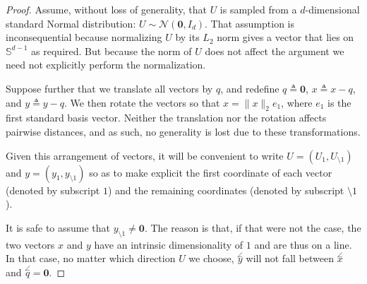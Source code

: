 \begin{proof}
Assume, without loss of generality, that $U$ is sampled from a $d$-dimensional standard Normal distribution: $U \sim \mathcal{N}(\mathbf{0}, I_d)$.
That assumption is inconsequential because normalizing $U$ by its $L_2$ norm gives a vector that lies on $\mathbb{S}^{d-1}$ as required.
But because the norm of $U$ does not affect the argument we need not explicitly perform the normalization.

Suppose further that we translate all vectors by $q$,
and redefine $q \triangleq \mathbf{0}$, $x \triangleq x - q$, and $y \triangleq y - q$.
We then rotate the vectors so that $x = \lVert x \rVert_2 e_1$, where $e_1$ is the first standard basis vector.
Neither the translation nor the rotation affects pairwise distances, and as such, no generality is lost due to these transformations.

Given this arrangement of vectors, it will be convenient to write $U = (U_1, U_{\setminus 1})$ and $y = (y_1, y_{\setminus 1})$
so as to make explicit the first coordinate of each vector (denoted by subscript $1$)
and the remaining coordinates (denoted by subscript $\setminus 1$).

It is safe to assume that $y_{\setminus 1} \neq \mathbf{0}$. The reason is that, if that were not the case,
the two vectors $x$ and $y$ have an intrinsic dimensionality of $1$ and are thus on a line.
In that case, no matter which direction $U$ we choose, $\overset{\angle}{y}$ will not fall between
$\overset{\angle}{x}$ and $\overset{\angle}{q} = \mathbf{0}$.


\end{proof}
